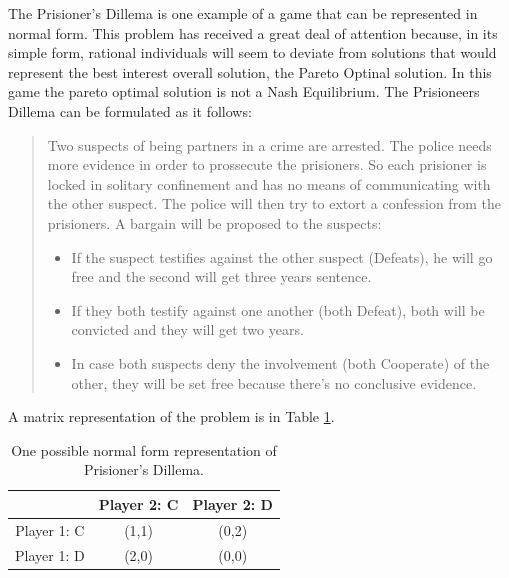The Prisioner's Dillema is one example of a game that can be represented
in normal form. This problem has received a great deal of attention
because, in its simple form, rational individuals will seem to deviate
from solutions that would represent the best interest overall solution,
the Pareto Optinal solution. In this game the pareto optimal solution
is not a Nash Equilibrium. The Prisioneers Dillema can be formulated
as it follows:

\begin{quotation}

Two suspects of being partners in a crime are arrested. The police
needs more evidence in order to prossecute the prisioners. So each
prisioner is locked in solitary confinement and has no means of communicating
with the other suspect. The police will then try to extort a confession
from the prisioners. A bargain will be proposed to the suspects:
\begin{itemize}
\item If the suspect testifies against the other suspect (Defeats), he will
go free and the second will get three years sentence.
\item If they both testify against one another (both Defeat), both will
be convicted and they will get two years.
\item In case both suspects deny the involvement (both Cooperate) of the
other, they will be set free because there's no conclusive evidence.
\end{itemize}
\end{quotation}

A matrix representation of the problem is in Table \ref{tab:prisionersdillema_tab1}.

\begin{center}
\begin{table}
\begin{centering}
\begin{tabular}{ccc}
\hline 
 & Player 2: C & Player 2: D\tabularnewline
\hline 
Player 1: C & (1,1) & (0,2)\tabularnewline
Player 1: D & (2,0) & (0,0)\tabularnewline
\hline 
\end{tabular}
\par\end{centering}

\caption{One possible normal form representation of Prisioner's Dillema.}
\label{tab:prisionersdillema_tab1}
\end{table}
\par\end{center}



